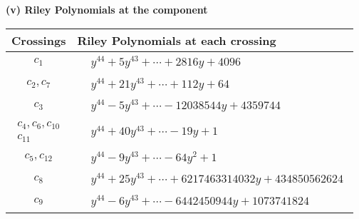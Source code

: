 \documentclass[1p]{elsarticle_modified}
\theoremstyle{definition}
\begin{document}
\newpage\renewcommand{\arraystretch}{1}
\flushleft \textbf{(v) Riley Polynomials at the component}\newline \\
\begin{tabular}{m{50pt}|m{274pt}}
Crossings & \hspace{64pt}Riley Polynomials at each crossing \\
\hline $$\begin{aligned}c_{1}\end{aligned}$$&$\begin{aligned}
&y^{44}+5 y^{43}+\cdots+2816 y+4096
\end{aligned}$\\
\hline $$\begin{aligned}c_{2},c_{7}\end{aligned}$$&$\begin{aligned}
&y^{44}+21 y^{43}+\cdots+112 y+64
\end{aligned}$\\
\hline $$\begin{aligned}c_{3}\end{aligned}$$&$\begin{aligned}
&y^{44}-5 y^{43}+\cdots-12038544 y+4359744
\end{aligned}$\\
\hline $$\begin{aligned}c_{4},c_{6},c_{10}\\c_{11}\end{aligned}$$&$\begin{aligned}
&y^{44}+40 y^{43}+\cdots-19 y+1
\end{aligned}$\\
\hline $$\begin{aligned}c_{5},c_{12}\end{aligned}$$&$\begin{aligned}
&y^{44}-9 y^{43}+\cdots-64 y^2+1
\end{aligned}$\\
\hline $$\begin{aligned}c_{8}\end{aligned}$$&$\begin{aligned}
&y^{44}+25 y^{43}+\cdots+6217463314032 y+434850562624
\end{aligned}$\\
\hline $$\begin{aligned}c_{9}\end{aligned}$$&$\begin{aligned}
&y^{44}-6 y^{43}+\cdots-6442450944 y+1073741824
\end{aligned}$\\
\hline
\end{tabular}\\~\\
\end{document}
